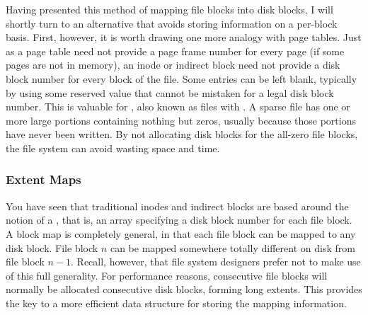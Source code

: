 Having presented this method of mapping file blocks into disk blocks, I
will shortly turn to an alternative that avoids storing information on
a per-block basis.  First, however, it is worth drawing one more
analogy with page tables.  Just as a page table need not provide a
page frame number for every page (if some pages are not in memory), an
inode or indirect block need not provide a disk block number for every
block of the file.  Some entries can be left blank, typically by using
some reserved value that cannot be mistaken for a legal disk block
number.  This is valuable for , also known as
files with .  A sparse file has one or more large
portions containing nothing but zeros, usually because those portions
have never been written.  By not allocating disk blocks for the
all-zero file blocks, the file system can avoid wasting space and time.

\subsubsection{Extent Maps}

You have seen that traditional inodes and indirect blocks are based
around the notion of a , that is, an array
specifying a disk block number for each file block.  A block map is
completely general, in that each file block can be mapped to any disk
block.  File block $n$ can be mapped somewhere totally different on
disk from file block $n-1$.  Recall, however, that file system designers prefer
not to make use of this full generality.  For performance reasons,
consecutive file blocks will normally be allocated consecutive disk
blocks, forming long extents.  This provides the key to a more
efficient data structure for storing the mapping information.

